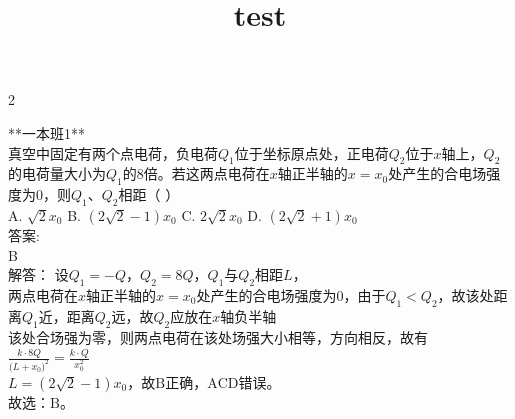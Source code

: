 \documentclass[12pt,a4paper]{ctexart}
\newcommand{\lt}{{<}}
\begin{document}
\title{test}
\author{}
\date{}
\maketitle

\begin{paracol}{2}

**一本班1**\\
真空中固定有两个点电荷，负电荷$Q_{1}$位于坐标原点处，正电荷$Q_{2}$位于$x$轴上，$Q_{2}$的电荷量大小为$Q_{1}$的$8$倍。若这两点电荷在$x$轴正半轴的$x=x_{0}$处产生的合电场强度为$0$，则$Q_{1}$、$Q_{2}$相距​（ ）\\
A.       $\sqrt{2}x_{0}$      B.       $(2\sqrt{2}-1)x_{0}$      C.       $2\sqrt{2}x_{0}$      D.       $(2\sqrt{2}+1)x_{0}$\\
答案:\\
B\\
解答：                             设$Q_{1}=-Q$，$Q_{2}=8Q$，$Q_{1}$与$Q_{2}$相距$L$，\\
两点电荷在$x$轴正半轴的$x=x_{0}$处产生的合电场强度为$0$，由于$Q_{1} \lt Q_{2}$，故该处距离$Q_{1}$近，距离$Q_{2}$远，故$Q_{2}$应放在$x$轴负半轴\\
该处合场强为零，则两点电荷在该处场强大小相等，方向相反，故有\\
$\frac{k\cdot 8Q}{(L+{x}_{0}{)}^{2}}=\frac{k\cdot Q}{{x}_{0}^{2}}$\\
$L=(2\sqrt{2}-1)x_0$，故$\mathrm{B}$正确，$\mathrm{ACD}$错误。\\
故选：$\mathrm{B}$。\\

\switchcolumn

\switchcolumn*

\end{paracol}
\end{document}
